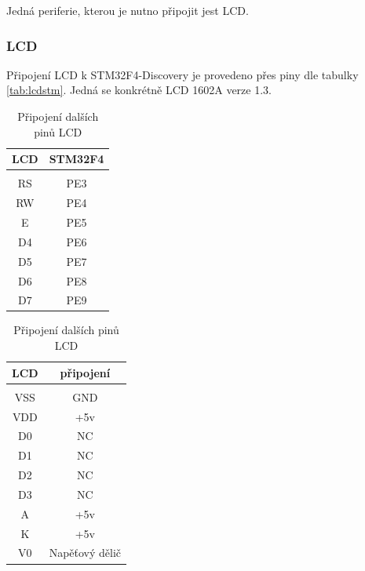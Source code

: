 \documentclass[10pt]{article}
\begin{document}
Jedná periferie, kterou je nutno připojit jest LCD.

\subsubsection{LCD}

Připojení LCD k STM32F4-Discovery je provedeno přes piny dle tabulky \ref{tab:lcdstm}.
Jedná se konkrétně LCD 1602A verze 1.3.


\begin{table}[!htb]
    \begin{minipage}{0.45\textwidth}
        \centering
        \begin{tabular}{c|c}
            LCD & STM32F4 \\
            \hline \\
            RS & PE3 \\
            RW & PE4 \\
            E  & PE5 \\ 
            D4 & PE6 \\
            D5 & PE7 \\
            D6 & PE8 \\
            D7 & PE9
        \end{tabular}
        
        \caption{Připojení LCD k STM32F4 Discovery}
        \label{tab:lcdstm}
    \end{minipage}
    \hfil
    \begin{minipage}{0.45\textwidth}
        \centering
        \begin{tabular}{c|c}
            LCD & připojení \\
            \hline \\
            VSS & GND \\
            VDD & +5v \\
            D0  & NC  \\
            D1  & NC  \\
            D2  & NC  \\
            D3  & NC  \\
            A   & +5v \\
            K   & +5v \\
            V0  & Napěťový dělič
        \end{tabular}
        \caption{Připojení dalších pinů LCD}
        \label{tab:lcdother}
    \end{minipage}
\end{table}
\end{document}
